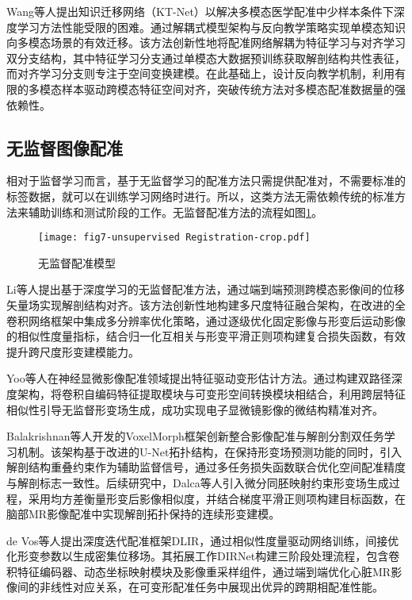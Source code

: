 Wang等人提出知识迁移网络（KT-Net）\cite{wang2023few}以解决多模态医学配准中少样本条件下深度学习方法性能受限的困难。通过解耦式模型架构与反向教学策略实现单模态知识向多模态场景的有效迁移。该方法创新性地将配准网络解耦为特征学习与对齐学习双分支结构，其中特征学习分支通过单模态大数据预训练获取解剖结构共性表征，而对齐学习分支则专注于空间变换建模。在此基础上，设计反向教学机制，利用有限的多模态样本驱动跨模态特征空间对齐，突破传统方法对多模态配准数据量的强依赖性。

\subsection{无监督图像配准}

相对于监督学习而言，基于无监督学习的配准方法只需提供配准对，不需要标准的标签数据，就可以在训练学习网络时进行。所以，这类方法无需依赖传统的标准方法来辅助训练和测试阶段的工作。无监督配准方法的流程如图\ref{fig:7}。

\begin{figure}[h]
    \centering
    \texttt{[image: fig7-unsupervised Registration-crop.pdf]}
    \caption{无监督配准模型}
    \label{fig:7}
\end{figure}


Li等人提出基于深度学习的无监督配准方法，通过端到端预测跨模态影像间的位移矢量场实现解剖结构对齐。该方法创新性地构建多尺度特征融合架构，在改进的全卷积网络框架中集成多分辨率优化策略，通过逐级优化固定影像与形变后运动影像的相似性度量指标，结合归一化互相关与形变平滑正则项构建复合损失函数，有效提升跨尺度形变建模能力\cite{long2015fully}。

Yoo等人在神经显微影像配准领域提出特征驱动变形估计方法。通过构建双路径深度架构，将卷积自编码特征提取模块与可变形空间转换模块相结合，利用跨层特征相似性引导无监督形变场生成，成功实现电子显微镜影像的微结构精准对齐\cite{avants2008symmetric}。

Balakrishnan等人开发的VoxelMorph框架创新整合影像配准与解剖分割双任务学习机制。该架构基于改进的U-Net拓扑结构，在保持形变场预测功能的同时，引入解剖结构重叠约束作为辅助监督信号，通过多任务损失函数联合优化空间配准精度与解剖标志一致性\cite{balakrishnan2018unsupervised,balakrishnan2019voxelmorph}。后续研究中，Dalca等人引入微分同胚映射约束形变场生成过程，采用均方差衡量形变后影像相似度，并结合梯度平滑正则项构建目标函数，在脑部MR影像配准中实现解剖拓扑保持的连续形变建模。

de Vos等人提出深度迭代配准框架DLIR，通过相似性度量驱动网络训练，间接优化形变参数以生成密集位移场\cite{de2019deep}。其拓展工作DIRNet构建三阶段处理流程，包含卷积特征编码器、动态坐标映射模块及影像重采样组件，通过端到端优化心脏MR影像间的非线性对应关系，在可变形配准任务中展现出优异的跨期相配准性能\cite{de2017end}。

